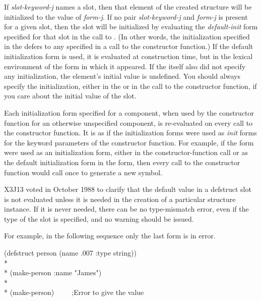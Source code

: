 \label{defstruct-initialization}
If \emph{slot-keyword-j} names a slot, then that element of
the created structure will be initialized to the value of \emph{form-j}.
If no pair \emph{slot-keyword-j} and \emph{form-j}
is present for a given slot, then the slot will be
initialized by evaluating the \emph{default-init} form specified
for that slot in the call to .
(In other words, the initialization specified in the 
defers to any specified in a call to the constructor function.)
If the default initialization form is used, it is evaluated
at construction time, but
in the lexical environment of the  form in which it appeared.
If the  itself also did not
specify any initialization, the element's initial value is undefined.
You should always specify the initialization, either in the 
or in the call to the constructor function,
if you care about the initial value of the slot.

Each initialization form specified for a  component,
when used by the constructor function for an otherwise unspecified
component, is re-evaluated on every call to the
constructor function.  It is as if the initialization forms were
used as \emph{init} forms for the keyword parameters of the
constructor function.
For example, if the form 
were used as an initialization form,
either in the constructor-function call or as the default initialization form
in the  form,
then every call to the constructor
function would call  once to generate a new symbol.

\begin{newer}
X3J13 voted in October 1988 
to clarify that the default value in a defstruct slot is not evaluated 
        unless it is needed in the creation of a particular structure
        instance.  If it is never needed, there can be no type-mismatch
        error, even if the type of the slot is specified, and no warning
        should be issued.


For example, in the following sequence only the last form is in error.
\begin{lisp}
(defstruct person (name .007 :type string)) \\*
\\*
(make-person :name "James") \\*
\\*
(make-person)~~~~~;\textrm{Error to give  the value }
\end{lisp}
\end{newer}


